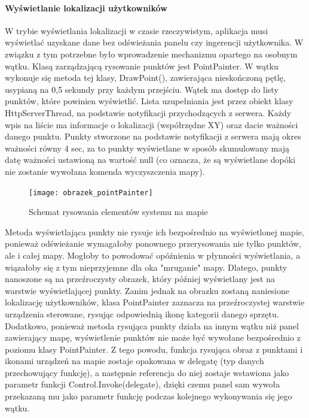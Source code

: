 \documentclass{article}
\begin{document}
		\paragraph{Wyświetlanie lokalizacji użytkowników} W trybie wyświetlania lokalizacji w czasie rzeczywistym, aplikacja musi wyświetlać uzyskane dane bez odświeżania panelu czy ingerencji użytkownika. W związku z tym potrzebne było wprowadzenie mechanizmu opartego na osobnym wątku. Klasą zarządzającą rysowanie punktów jest PointPainter. W wątku wykonuje się metoda tej klasy, DrawPoint(), zawierająca nieskończoną pętlę, usypianą na 0,5 sekundy przy każdym przejściu. Wątek ma dostęp do listy punktów, które powinien wyświetlić. Lista uzupełniania jest przez obiekt klasy HttpServerThread, na podstawie notyfikacji przychodzących z serwera. Każdy wpis na liście ma informacje o lokalizacji (współrzędne XY) oraz dacie ważności danego punktu. Punkty stworzone na podstawie notyfikacji z serwera mają okres ważności równy 4 sec, za to punkty wyświetlane w sposób skumulowany mają datę ważności ustawioną na wartość null (co oznacza, że są wyświetlane dopóki nie zostanie wywołana komenda wyczyszczenia mapy).
		\begin{figure}[H]			
			\centering
			\caption{Schemat rysowania elementów systemu na mapie}
			\texttt{[image: obrazek\_pointPainter]}
		\end{figure}
		Metoda wyświetlająca punkty nie rysuje ich bezpośrednio na wyświetlonej mapie, ponieważ odświeżanie wymagałoby ponownego przerysowania nie tylko punktów, ale i całej mapy. Mogłoby to powodować opóźnienia w płynności wyświetlania, a wiązałoby się z tym nieprzyjemne dla oka "mruganie" mapy. Dlatego, punkty nanoszone są na przeźroczysty obrazek, który później wyświetlany jest na warstwie wyświetlającej punkty. Zanim jednak na obrazku zostaną naniesione lokalizację użytkowników, klasa PointPainter zaznacza na przeźroczystej warstwie urządzenia sterowane, rysując odpowiednią ikonę kategorii danego sprzętu. Dodatkowo, ponieważ metoda rysująca punkty działa na innym wątku niż panel zawierający mapę, wyświetlenie punktów nie może być wywołane bezpośrednio z poziomu klasy PointPainter. Z tego powodu, funkcja rysująca obraz z punktami i ikonami urządzeń na mapie zostaje opakowana w delegatę (typ danych przechowujący funkcję), a następnie referencja do niej zostaje wstawiona jako parametr funkcji Control.Invoke(delegate), dzięki czemu panel sam wywoła przekazaną mu jako parametr funkcję podczas kolejnego wykonywania się jego wątku.
\end{document}
